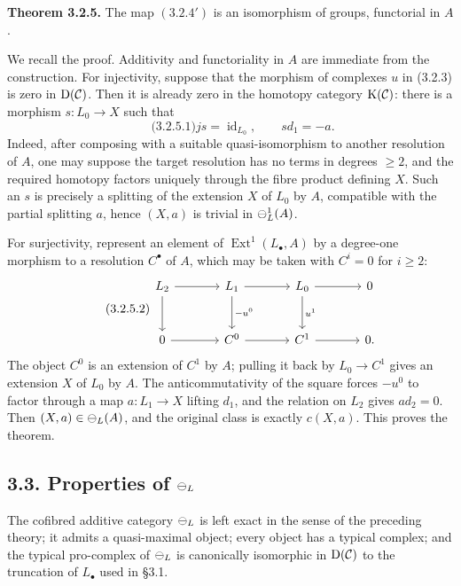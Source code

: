 \documentclass[11pt]{article}
\providecommand{\Ext}{\operatorname{Ext}}
\providecommand{\id}{\operatorname{id}}
\begin{document}
\textbf{Theorem 3.2.5.}  The map \((3.2.4')\) is an isomorphism of groups, functorial in \(A\).

We recall the proof.  Additivity and functoriality in \(A\) are immediate from the construction.  For injectivity, suppose that the morphism of complexes \(u\) in (3.2.3) is zero in \(\mathrm D(\mathcal C)\).  Then it is already zero in the homotopy category \(\mathrm K(\mathcal C)\): there is a morphism \(s:L_0\to X\) such that
\begin{equation}\qquad\text{(3.2.5.1)}
  js=\id_{L_0},\qquad s d_1=-a.
\end{equation}
Indeed, after composing with a suitable quasi-isomorphism to another resolution of \(A\), one may suppose the target resolution has no terms in degrees \(\geq2\), and the required homotopy factors uniquely through the fibre product defining \(X\).  Such an \(s\) is precisely a splitting of the extension \(X\) of \(L_0\) by \(A\), compatible with the partial splitting \(a\), hence \((X,a)\) is trivial in \(\mathcal\Psi^1_L(A)\).

For surjectivity, represent an element of \(\Ext^1(L_\bullet,A)\) by a degree-one morphism to a resolution \(C^\bullet\) of \(A\), which may be taken with \(C^i=0\) for \(i\geq2\):
\begin{equation}\qquad\text{(3.2.5.2)}
\begin{tikzcd}[column sep=large,row sep=large]
L_2\arrow[r]\arrow[d]&L_1\arrow[r]\arrow[d,"-u^0"]&L_0\arrow[d,"u^1"]\arrow[r]&0\\
0\arrow[r]&C^0\arrow[r]&C^1\arrow[r]&0 .
\end{tikzcd}
\end{equation}
The object \(C^0\) is an extension of \(C^1\) by \(A\); pulling it back by \(L_0\to C^1\) gives an extension \(X\) of \(L_0\) by \(A\).  The anticommutativity of the square forces \(-u^0\) to factor through a map \(a:L_1\to X\) lifting \(d_1\), and the relation on \(L_2\) gives \(a d_2=0\).  Then \((X,a)\in\mathcal\Psi_L(A)\), and the original class is exactly \(c(X,a)\).  This proves the theorem.

\subsection*{3.3. Properties of \(\mathcal\Psi_L\)}
The cofibred additive category \(\mathcal\Psi_L\) is left exact in the sense of the preceding theory; it admits a quasi-maximal object; every object has a typical complex; and the typical pro-complex of \(\mathcal\Psi_L\) is canonically isomorphic in \(\mathrm D(\mathcal C)\) to the truncation of \(L_\bullet\) used in \S3.1.
\end{document}
